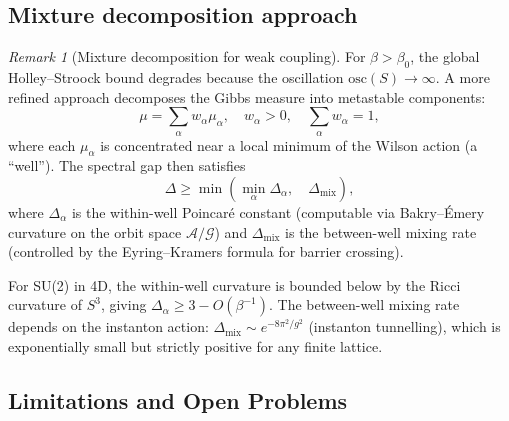 \documentclass[12pt,a4paper]{article}
\theoremstyle{definition}
\theoremstyle{plain}
\theoremstyle{remark}
\newtheorem{remark}[definition]{Remark}
\begin{document}
\subsection{Mixture decomposition approach}

\begin{remark}[Mixture decomposition for weak coupling]
\label{rem:mixture-decomposition}
For $\beta > \beta_0$, the global Holley--Stroock bound degrades because the oscillation $\mathrm{osc}(S) \to \infty$. A more refined approach decomposes the Gibbs measure into metastable components:
\[
\mu = \sum_{\alpha} w_\alpha \mu_\alpha, \quad w_\alpha > 0, \quad \sum_\alpha w_\alpha = 1,
\]
where each $\mu_\alpha$ is concentrated near a local minimum of the Wilson action (a ``well''). The spectral gap then satisfies
\[
\Delta \geq \min\left( \min_\alpha \Delta_\alpha, \quad \Delta_{\mathrm{mix}} \right),
\]
where $\Delta_\alpha$ is the within-well Poincar\'e constant (computable via Bakry--\'Emery curvature on the orbit space $\mathcal{A}/\mathcal{G}$) and $\Delta_{\mathrm{mix}}$ is the between-well mixing rate (controlled by the Eyring--Kramers formula for barrier crossing).

For SU(2) in 4D, the within-well curvature is bounded below by the Ricci curvature of $S^3$, giving $\Delta_\alpha \geq 3 - O(\beta^{-1})$. The between-well mixing rate depends on the instanton action: $\Delta_{\mathrm{mix}} \sim e^{-8\pi^2/g^2}$ (instanton tunnelling), which is exponentially small but strictly positive for any finite lattice.
\end{remark}

\subsection{Limitations and Open Problems}
\end{document}
